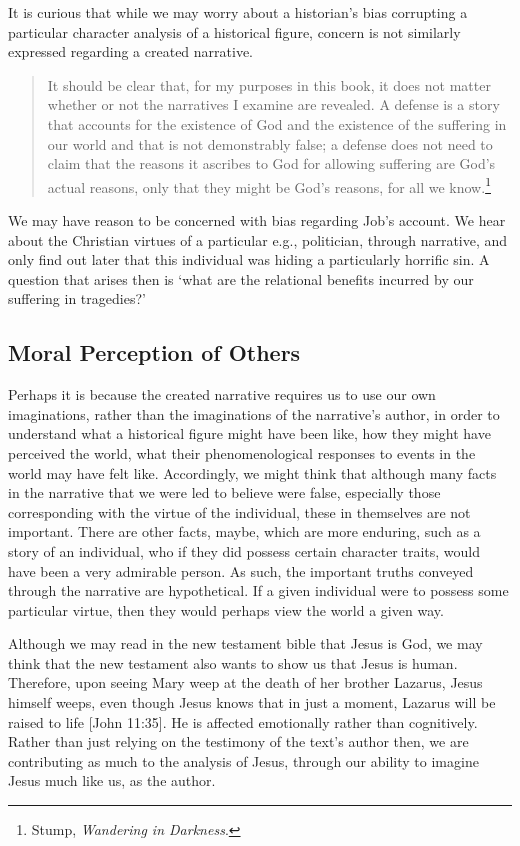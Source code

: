 \documentclass[
  12pt,
]{book}
\theoremstyle{definition}
\theoremstyle{definition}
\theoremstyle{definition}
\theoremstyle{definition}
\theoremstyle{remark}
\begin{document}
It is curious that while we may worry about a historian's bias corrupting a particular character analysis of a historical figure, concern is not similarly expressed regarding a created narrative.

\begin{quote}
It should be clear that, for my purposes in this book, it does not matter whether or not the narratives I examine are revealed. A defense is a story that accounts for the existence of God and the existence of the suffering in our world and that is not demonstrably false; a defense does not need to claim that the reasons it ascribes to God for allowing suffering are God's actual reasons, only that they might be God's reasons, for all we know.\footnote{Stump, \emph{Wandering in {Darkness}}.}
\end{quote}

We may have reason to be concerned with bias regarding Job's account. We hear about the Christian virtues of a particular e.g., politician, through narrative, and only find out later that this individual was hiding a particularly horrific sin. A question that arises then is `what are the relational benefits incurred by our suffering in tragedies?'

\subsection*{Moral Perception of Others}\label{moral-perception-of-others-1}

Perhaps it is because the created narrative requires us to use our own imaginations, rather than the imaginations of the narrative's author, in order to understand what a historical figure might have been like, how they might have perceived the world, what their phenomenological responses to events in the world may have felt like. Accordingly, we might think that although many facts in the narrative that we were led to believe were false, especially those corresponding with the virtue of the individual, these in themselves are not important. There are other facts, maybe, which are more enduring, such as a story of an individual, who if they did possess certain character traits, would have been a very admirable person. As such, the important truths conveyed through the narrative are hypothetical. If a given individual were to possess some particular virtue, then they would perhaps view the world a given way.

Although we may read in the new testament bible that Jesus is God, we may think that the new testament also wants to show us that Jesus is human. Therefore, upon seeing Mary weep at the death of her brother Lazarus, Jesus himself weeps, even though Jesus knows that in just a moment, Lazarus will be raised to life {[}John 11:35{]}. He is affected emotionally rather than cognitively. Rather than just relying on the testimony of the text's author then, we are contributing as much to the analysis of Jesus, through our ability to imagine Jesus much like us, as the author.
\end{document}
